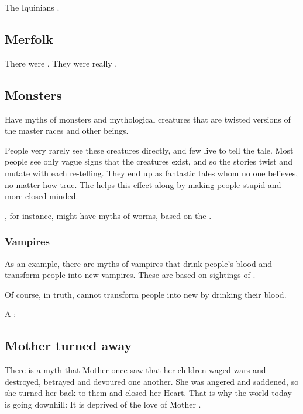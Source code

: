 The Iquinians .









\subsection{Merfolk}
There were .
They were really \nagae.








\subsection{Monsters}
Have myths of monsters and mythological creatures that are twisted versions of the master races and other beings. 

People very rarely see these creatures directly, and few live to tell the tale. Most people see only vague signs that the creatures exist, and so the stories twist and mutate with each re-telling. They end up as fantastic tales whom no one believes, no matter how true. The  helps this effect along by making people stupid and more closed-minded. 

, for instance, might have myths of worms, based on the . 





\subsubsection{Vampires}
As an example, there are myths of vampires that drink people's blood and transform people into new vampires. These are based on sightings of . 

Of course, in truth, \resphain{} cannot transform people into new \resphain{} by drinking their blood. 

A \resphan: 









\subsection{Mother \Miith turned away}
There is a myth that Mother \Miith{} once saw that her children waged wars and destroyed, betrayed and devoured one another. 
She was angered and saddened, so she turned her back to them and closed her Heart.
That is why the world today is going downhill: 
It is deprived of the love of Mother \Miith{}. 

